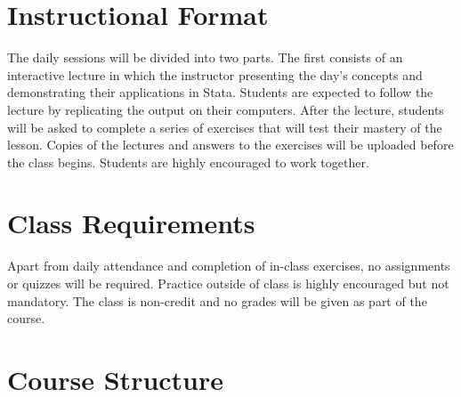 \documentclass[11pt]{article}
\begin{document}

\section*{Instructional Format}

The daily sessions will be divided into two parts. The first consists of an interactive lecture in which the instructor presenting the day’s concepts and demonstrating their applications in Stata. Students are expected to follow the lecture by replicating the output on their computers. After the lecture,  students will be asked to complete a series of exercises that will test their mastery of the lesson. Copies of the lectures and answers to the exercises will be uploaded before the class begins. Students are highly encouraged to work together. 


\section*{Class Requirements}
Apart from daily attendance and completion of in-class exercises, no assignments or quizzes will be required. Practice outside of class is highly encouraged but not mandatory. The class is non-credit and no grades will be given as part of the course.     




\section*{Course Structure}
\end{document}
